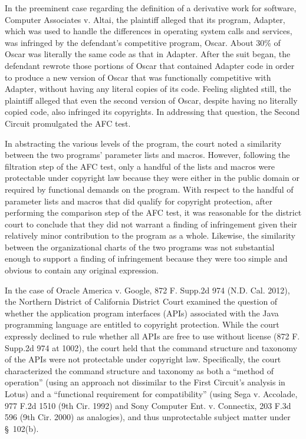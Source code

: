In the preeminent case regarding the definition of a derivative work for
software, Computer Associates v. Altai, the plaintiff alleged that its
program, Adapter, which was used to handle the differences in operating
system calls and services, was infringed by the defendant's competitive
program, Oscar. About 30\% of Oscar was literally the same code as
that in Adapter. After the suit began, the defendant rewrote those
portions of Oscar that contained Adapter code in order to produce a new
version of Oscar that was functionally competitive with Adapter, without
having any literal copies of its code. Feeling slighted still, the
plaintiff alleged that even the second version of Oscar, despite having no
literally copied code, also infringed its copyrights. In addressing that
question, the Second Circuit promulgated the AFC test.

In abstracting the various levels of the program, the court noted a
similarity between the two programs' parameter lists and macros. However,
following the filtration step of the AFC test, only a handful of the lists
and macros were protectable under copyright law because they were either
in the public domain or required by functional demands on the
program. With respect to the handful of parameter lists and macros that
did qualify for copyright protection, after performing the comparison step
of the AFC test, it was reasonable for the district court to conclude that
they did not warrant a finding of infringement given their relatively minor
contribution to the program as a whole. Likewise, the similarity between
the organizational charts of the two programs was not substantial enough
to support a finding of infringement because they were too simple and
obvious to contain any original expression.

In the case of Oracle America v. Google, 872 F. Supp.2d 974 (N.D. Cal. 2012),
the Northern District of California District Court examined the question of 
whether the application program interfaces (APIs) associated with the Java
programming language are entitled to copyright protection.  While the 
court expressly declined to rule whether all APIs are free to use without 
license (872 F. Supp.2d 974 at 1002), the court held that the command 
structure and taxonomy of the APIs were not protectable under copyright law.
Specifically, the court characterized the command structure and taxonomy as
both a ``method of operation'' (using an approach not dissimilar to the 
First Circuit's analysis in Lotus) and a ``functional requirement for 
compatibility'' (using Sega v. Accolade, 977 F.2d 1510 (9th Cir. 1992) and
Sony Computer Ent. v. Connectix, 203 F.3d 596 (9th Cir. 2000) as analogies),
and thus unprotectable subject matter under \S~102(b). 

